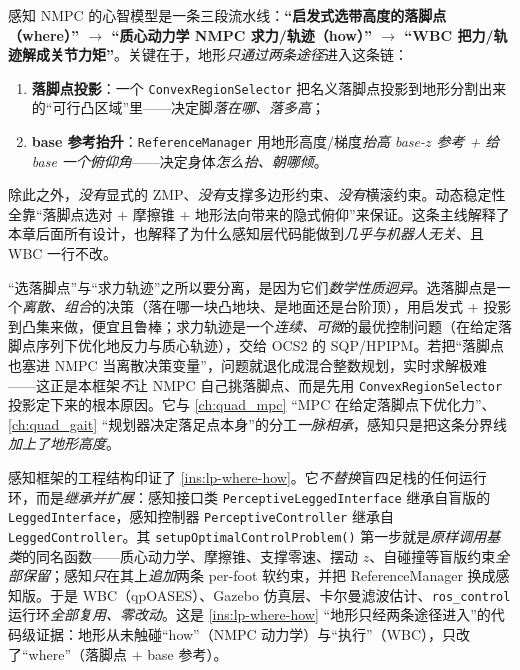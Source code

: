 \begin{insight}[全章主线·感知 = 选带高度的落脚点 + 抬身体，求解器照旧]\label{ins:lp-where-how}
感知 NMPC 的心智模型是一条三段流水线：\textbf{“启发式选带高度的落脚点（where）” $\to$ “质心动力学 NMPC 求力/轨迹（how）” $\to$ “WBC 把力/轨迹解成关节力矩”}。关键在于，地形\emph{只通过两条途径}进入这条链：
\begin{enumerate}
  \item \textbf{落脚点投影}：一个 \texttt{ConvexRegionSelector} 把名义落脚点投影到地形分割出来的“可行凸区域”里——决定脚\emph{落在哪、落多高}；
  \item \textbf{base 参考抬升}：\texttt{ReferenceManager} 用地形高度/梯度\emph{抬高 base-$z$ 参考 + 给 base 一个俯仰角}——决定身体\emph{怎么抬、朝哪倾}。
\end{enumerate}
除此之外，\emph{没有}显式的 ZMP、\emph{没有}支撑多边形约束、\emph{没有}横滚约束。动态稳定性全靠“落脚点选对 + 摩擦锥 + 地形法向带来的隐式俯仰”来保证。这条主线解释了本章后面所有设计，也解释了为什么感知层代码能做到\emph{几乎与机器人无关}、且 WBC 一行不改。
\end{insight}

\begin{insight}[where/how 分离 = 离散规划与连续控制的分工]\label{ins:lp-discrete-continuous}
“选落脚点”与“求力轨迹”之所以要分离，是因为它们\emph{数学性质迥异}。选落脚点是一个\emph{离散、组合}的决策（落在哪一块凸地块、是地面还是台阶顶），用启发式 + 投影到凸集来做，便宜且鲁棒；求力轨迹是一个\emph{连续、可微}的最优控制问题（在给定落脚点序列下优化地反力与质心轨迹），交给 OCS2 的 SQP/HPIPM。若把“落脚点也塞进 NMPC 当离散决策变量”，问题就退化成混合整数规划，实时求解极难——这正是本框架\emph{不}让 NMPC 自己挑落脚点、而是先用 \texttt{ConvexRegionSelector} 投影定下来的根本原因。它与 \cref{ch:quad_mpc} “MPC 在给定落脚点下优化力”、\cref{ch:quad_gait} “规划器决定落足点本身”的分工\emph{一脉相承}，感知只是把这条分界线\emph{加上了地形高度}。
\end{insight}

\begin{insight}\label{ins:lp-overlay}
感知框架的工程结构印证了 \cref{ins:lp-where-how}。它\emph{不替换}盲四足栈的任何运行环，而是\emph{继承并扩展}：感知接口类 \texttt{PerceptiveLeggedInterface} 继承自盲版的 \texttt{LeggedInterface}，感知控制器 \texttt{PerceptiveController} 继承自 \texttt{LeggedController}。其 \texttt{setupOptimalControlProblem()} 第一步就是\emph{原样调用基类}的同名函数——质心动力学、摩擦锥、支撑零速、摆动 $z$、自碰撞等盲版约束\emph{全部保留}；感知\emph{只}在其上\emph{追加}两条 per-foot 软约束，并把 ReferenceManager 换成感知版。于是 WBC（qpOASES）、Gazebo 仿真层、卡尔曼滤波估计、\texttt{ros\_control} 运行环\emph{全部复用、零改动}。这是 \cref{ins:lp-where-how} “地形只经两条途径进入”的代码级证据：地形从未触碰“how”（NMPC 动力学）与“执行”（WBC），只改了“where”（落脚点 + base 参考）。
\end{insight}

